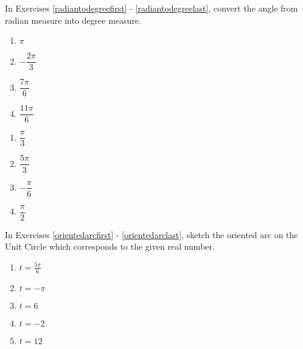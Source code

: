 \documentclass{ximera}
\begin{document}
In Exercises \ref{radiantodegreefirst} - \ref{radiantodegreelast}, convert the angle from radian measure into degree measure.

\begin{multicols}{4} 

\begin{enumerate}

\setcounter{enumi}{\value{HW}}

\item $\pi$  \label{radiantodegreefirst}
\item $-\dfrac{2\pi}{3}$
\item $\dfrac{7\pi}{6}$
\item $\dfrac{11\pi}{6}$

\setcounter{HW}{\value{enumi}}

\end{enumerate}

\end{multicols}

\begin{multicols}{4} 

\begin{enumerate}

\setcounter{enumi}{\value{HW}}

\item $\dfrac{\pi}{3}$ 
\item $\dfrac{5\pi}{3}$
\item $-\dfrac{\pi}{6}$ 
\item $\dfrac{\pi}{2}$  \label{radiantodegreelast}

\setcounter{HW}{\value{enumi}}

\end{enumerate}

\end{multicols}


In Exercises \ref{orientedarcfirst} - \ref{orientedarclast}, sketch the oriented arc on the Unit Circle which  corresponds to the given real number. 

\begin{multicols}{5} 

\begin{enumerate}

\setcounter{enumi}{\value{HW}}

\item $t=\frac{5 \pi}{6}$ \label{orientedarcfirst}

\item $t=-\pi$

\item $t = 6$

\item  $t = -2$

\item  $t = 12$ \label{orientedarclast}

\setcounter{HW}{\value{enumi}}

\end{enumerate}

\end{multicols}
\end{document}
